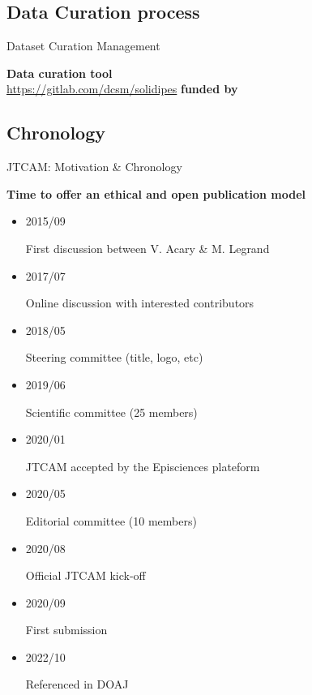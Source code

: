 \documentclass[10pt,compress,serif,aspectratio=169]{beamer}
\begin{document}

\subsection{Data Curation process}
\begin{frame}[t]{Dataset Curation Management}
  \begin{minipage}{.29\textwidth}
    \textbf{Data curation tool}
    \\
    {\tiny
      \url{https://gitlab.com/dcsm/solidipes}}\newline\newline
    \textbf{funded by\\}
\end{minipage}
\hfill
\begin{minipage}{.29\textwidth}
\end{minipage}
\end{frame}


\subsection{Chronology}
\begin{frame}[t]{JTCAM: Motivation \& Chronology}

 \begin{center}
   \Large
   \textbf{Time to offer an ethical and open publication model}
 \end{center}
\vfill
 \begin{itemize}
  \item \parbox{1.5cm}{2015/09} First discussion between V. Acary \& M. Legrand\\[.5em]
  \item \parbox{1.5cm}{2017/07} Online discussion with interested contributors\\[.5em]
  \item \parbox{1.5cm}{2018/05} Steering committee (title, logo, etc)\\[.5em]
  \item \parbox{1.5cm}{2019/06} Scientific committee (25 members)\\[.5em]
  \item \parbox{1.5cm}{2020/01} JTCAM accepted by the Episciences plateform\\[.5em]
  \item \parbox{1.5cm}{2020/05} Editorial committee (10 members)\\[.5em]
  \item \parbox{1.5cm}{2020/08} Official JTCAM kick-off\\[.5em]
  \item \parbox{1.5cm}{2020/09} First submission
  \item \parbox{1.5cm}{2022/10} Referenced in DOAJ
 \end{itemize}

\end{frame}
\end{document}
